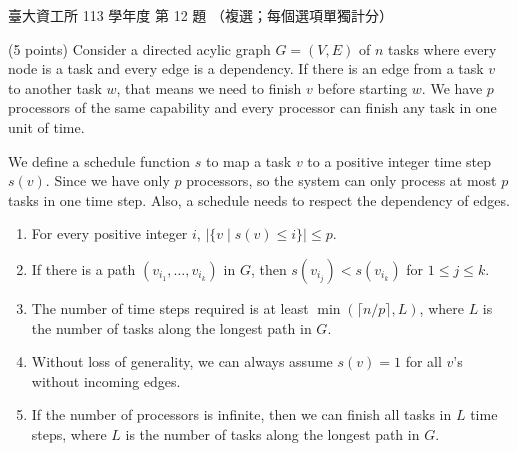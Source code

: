\begin{pastexam}[label={px:ntu-113-dsa-12}]{臺大資工所 113 學年度 第 12 題}
（複選；每個選項單獨計分）

(5 points) Consider a directed acylic graph $G=(V,E)$ of $n$ tasks where every node is a task and
every edge is a dependency. If there is an edge from a task $v$ to another task $w$, that means we need
to finish $v$ before starting $w$. We have $p$ processors of the same capability and every processor
can finish any task in one unit of time.

We define a schedule function $s$ to map a task $v$ to a positive integer time step $s(v)$. Since we
have only $p$ processors, so the system can only process at most $p$ tasks in one time step. Also, a
schedule needs to respect the dependency of edges.
\begin{enumerate}[label=\Alph*.]
\item For every positive integer $i$, $|\{v\mid s(v)\le i\}|\le p$.
\item If there is a path $(v_{i_1},\ldots,v_{i_k})$ in $G$, then $s(v_{i_j})<s(v_{i_k})$ for
$1\le j\le k$.
\item The number of time steps required is at least $\min(\lceil n/p\rceil,L)$, where $L$ is the
number of tasks along the longest path in $G$.
\item Without loss of generality, we can always assume $s(v)=1$ for all $v$'s without incoming
edges.
\item If the number of processors is infinite, then we can finish all tasks in $L$ time steps, where
$L$ is the number of tasks along the longest path in $G$.
\end{enumerate}
\end{pastexam}

